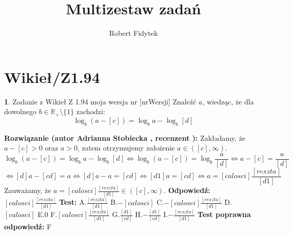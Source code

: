 \documentclass[12pt, a4paper]{article}
\title{Multizestaw zadań}
\author{Robert Fidytek}
\date{}
\theoremstyle{definition} %
\newtheorem{zad}{}
\newcommand{\kategoria}[1]{\section{#1}} %
\newcommand{\zadStart}[1]{\begin{zad}#1\newline} %
\newcommand{\zadStop}{\end{zad}}   %
\newcommand{\rozwStart}[2]{\noindent \textbf{Rozwiązanie (autor #1 , recenzent #2): }\newline} %
\newcommand{\rozwStop}{\newline}                                            %
\newcommand{\odpStart}{\noindent \textbf{Odpowiedź:}\newline}    %
\newcommand{\odpStop}{\newline}                                             %
\newcommand{\testStart}{\noindent \textbf{Test:}\newline} %
\newcommand{\testStop}{\newline} %
\newcommand{\kluczStart}{\noindent \textbf{Test poprawna odpowiedź:}\newline} %
\newcommand{\kluczStop}{\newline} %
\begin{document}
\maketitle


\kategoria{Wikieł/Z1.94}
\zadStart{Zadanie z Wikieł Z 1.94 moja wersja nr [nrWersji]}
Znaleźć $a$, wiedząc, że dla dowolnego $b\in\mathbb{R}_+\setminus\{1\}$ zachodzi:
$$\log_b{(a-[c])}=\log_b{a}-\log_b{[d]}$$
\zadStop
\rozwStart{Adrianna Stobiecka}{}
Zakładamy, że $a-[c]>0$ oraz $a>0$, zatem otrzymujemy założenie $a\in([c],\infty)$.
$$\log_b{(a-[c])}=\log_b{a}-\log_b{[d]}\Leftrightarrow\log_b{(a-[c])}=\log_b{\frac{a}{[d]}}\Leftrightarrow a-[c]=\frac{a}{[d]}$$
$$\Leftrightarrow [d]a-[cd]=a\Leftrightarrow[d]a-a=[cd]\Leftrightarrow[d1]a=[cd]\Leftrightarrow a=[calosci]\frac{[reszta]}{[d1]}$$
Zauważamy, że $a=[calosci]\frac{[reszta]}{[d1]}\in([c],\infty)$.
\rozwStop
\odpStart
$[calosci]\frac{[reszta]}{[d1]}$
\odpStop
\testStart
A.$\frac{[reszta]}{[d1]}$
B.$-[calosci]$
C.$-[calosci]\frac{[reszta]}{[d1]}$
D.$[calosci]$
E.$0$
F.$[calosci]\frac{[reszta]}{[d1]}$
G.$\frac{[d1]}{[cd]}$
H.$-\frac{[d1]}{[cd]}$
I.$-\frac{[reszta]}{[d1]}$
\testStop
\kluczStart
F
\kluczStop
\end{document}
